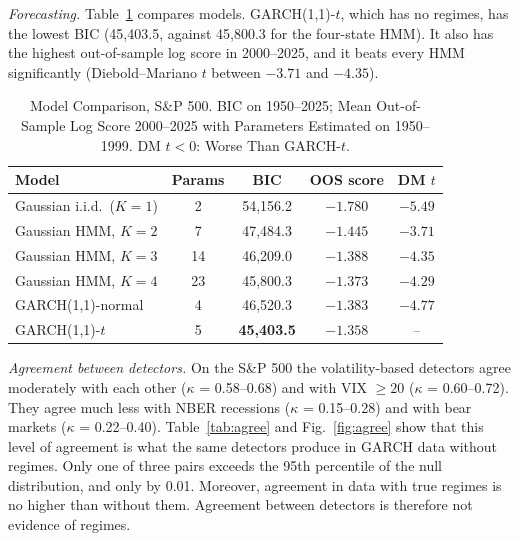 \documentclass[conference]{IEEEtran}
\begin{document}
\emph{Forecasting.} Table~\ref{tab:mc} compares models. GARCH(1,1)-$t$, which has no regimes, has the lowest BIC (45{,}403.5, against 45{,}800.3 for the four-state HMM). It also has the highest out-of-sample log score in 2000--2025, and it beats every HMM significantly (Diebold--Mariano $t$ between $-3.71$ and $-4.35$).

\begin{table}[t]
\centering
\caption{Model Comparison, S\&P 500. BIC on 1950--2025; Mean Out-of-Sample Log Score 2000--2025 with Parameters Estimated on 1950--1999. DM $t<0$: Worse Than GARCH-$t$.}
\label{tab:mc}
\footnotesize
\setlength{\tabcolsep}{4pt}
\begin{tabular}{lcccc}
\toprule
Model & Params & BIC & OOS score & DM $t$ \\
\midrule
Gaussian i.i.d.\ ($K{=}1$) & 2 & 54{,}156.2 & $-1.780$ & $-5.49$ \\
Gaussian HMM, $K{=}2$ & 7 & 47{,}484.3 & $-1.445$ & $-3.71$ \\
Gaussian HMM, $K{=}3$ & 14 & 46{,}209.0 & $-1.388$ & $-4.35$ \\
Gaussian HMM, $K{=}4$ & 23 & 45{,}800.3 & $-1.373$ & $-4.29$ \\
GARCH(1,1)-normal & 4 & 46{,}520.3 & $-1.383$ & $-4.77$ \\
GARCH(1,1)-$t$ & 5 & \textbf{45{,}403.5} & $\mathbf{-1.358}$ & -- \\
\bottomrule
\end{tabular}
\end{table}

\emph{Agreement between detectors.} On the S\&P 500 the volatility-based detectors agree moderately with each other ($\kappa$ = 0.58--0.68) and with VIX $\geq 20$ ($\kappa$ = 0.60--0.72). They agree much less with NBER recessions ($\kappa$ = 0.15--0.28) and with bear markets ($\kappa$ = 0.22--0.40). Table~\ref{tab:agree} and Fig.~\ref{fig:agree} show that this level of agreement is what the same detectors produce in GARCH data without regimes. Only one of three pairs exceeds the 95th percentile of the null distribution, and only by 0.01. Moreover, agreement in data with true regimes is no higher than without them. Agreement between detectors is therefore not evidence of regimes.

\begin{table}[t]
\centering
\caption{Agreement Between Detectors (Cohen's $\kappa$, Ex Post): S\&P 500 vs.\ Simulated Data}
\label{tab:agree}
\footnotesize
\setlength{\tabcolsep}{3pt}
\end{table}
\end{document}
